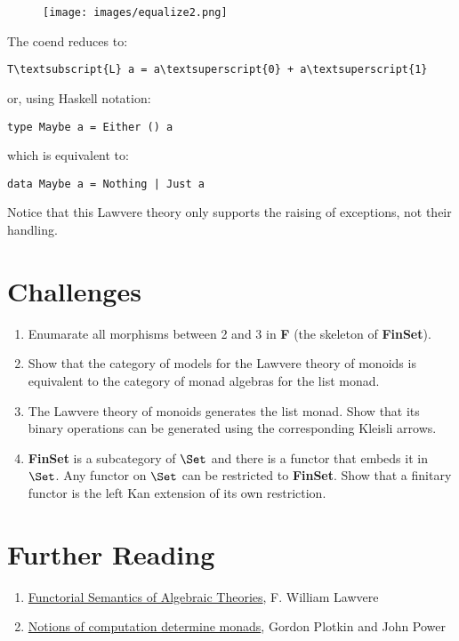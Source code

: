 \begin{figure}[H]
\centering
\texttt{[image: images/equalize2.png]}
\end{figure}

\noindent
The coend reduces to:

\begin{Verbatim}[commandchars=\\\{\}]
T\textsubscript{L} a = a\textsuperscript{0} + a\textsuperscript{1}
\end{Verbatim}
or, using Haskell notation:

\begin{Verbatim}[commandchars=\\\{\}]
type Maybe a = Either () a
\end{Verbatim}
which is equivalent to:

\begin{Verbatim}[commandchars=\\\{\}]
data Maybe a = Nothing | Just a
\end{Verbatim}
Notice that this Lawvere theory only supports the raising of exceptions,
not their handling.

\section{Challenges}\label{challenges}

\begin{enumerate}
\tightlist
\item
  Enumarate all morphisms between 2 and 3 in \textbf{F} (the skeleton of
  \textbf{FinSet}).
\item
  Show that the category of models for the Lawvere theory of monoids is
  equivalent to the category of monad algebras for the list monad.
\item
  The Lawvere theory of monoids generates the list monad. Show that its
  binary operations can be generated using the corresponding Kleisli
  arrows.
\item
  \textbf{FinSet} is a subcategory of $\Set$ and there is a
  functor that embeds it in $\Set$. Any functor on $\Set$
  can be restricted to \textbf{FinSet}. Show that a finitary functor is
  the left Kan extension of its own restriction.
\end{enumerate}

\section{Further Reading}\label{further-reading}
\begin{enumerate}
  \tightlist
  \item
  \href{http://www.tac.mta.ca/tac/reprints/articles/5/tr5.pdf}{Functorial Semantics of Algebraic Theories}, F. William Lawvere
  \item
  \href{http://homepages.inf.ed.ac.uk/gdp/publications/Comp_Eff_Monads.pdf}{Notions of computation determine monads}, Gordon Plotkin and John Power
\end{enumerate}